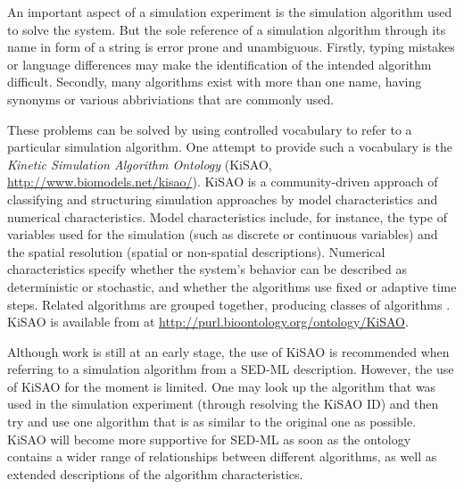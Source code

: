 \label{sec:kisao}

An important aspect of a simulation experiment is the simulation algorithm used to solve the system.
But the sole reference of a simulation algorithm through its name in form of a string is error prone and unambiguous. Firstly, typing mistakes or language differences may make the identification of the intended algorithm difficult. Secondly, many algorithms exist with more than one name, having synonyms or various abbriviations that are commonly used.

These problems can be solved by using controlled vocabulary to refer to a particular simulation algorithm. One attempt to provide such a vocabulary is the \emph{Kinetic Simulation Algorithm Ontology} (KiSAO, \url{http://www.biomodels.net/kisao/}). KiSAO is a community-driven approach of classifying and structuring simulation approaches by model characteristics and numerical characteristics.  Model characteristics include, for instance, the type of variables used for the simulation (such as discrete or continuous variables) and the spatial resolution (spatial or non-spatial descriptions). Numerical characteristics specify whether the system's behavior can be described as deterministic or stochastic, and whether the algorithms use fixed or adaptive time steps.  
Related algorithms are grouped together, producing classes of algorithms \citep{CWK+10}.
KiSAO is available from  at \url{http://purl.bioontology.org/ontology/KiSAO}.
%
%

Although work is still at an early stage, the use of KiSAO is recommended when referring to a simulation algorithm from a SED-ML description. However, the use of KiSAO for the moment is limited. One may look up the algorithm that was used in the simulation experiment (through resolving the KiSAO ID) and then try and use one algorithm that is as similar to the original one as possible. KiSAO will become more supportive for SED-ML as soon as the ontology contains a wider range of relationships between different algorithms, as well as extended descriptions of the algorithm characteristics.


